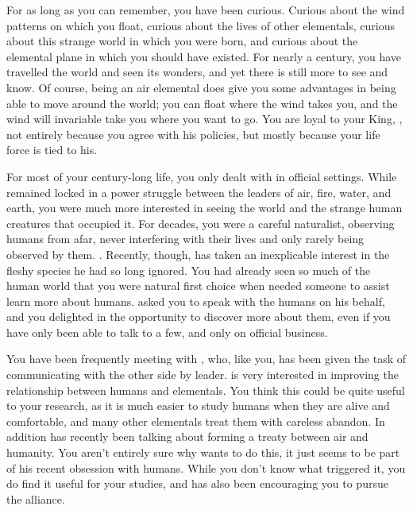 \documentclass[char]{elementals}
\begin{document}
\name{\cNaturalist{}}

For as long as you can remember, you have been curious.  Curious about the wind patterns on which you float, curious about the lives of other elementals, curious about this strange world in which you were born, and curious about the elemental plane in which you should have existed.  For nearly a century, you have travelled the world and seen its wonders, and yet there is still more to see and know.  Of course, being an air elemental does give you some advantages in being able to move around the world; you can float where the wind takes you, and the wind will invariable take you where you want to go.  You are loyal to your King, \cKing{\intro}, not entirely because you agree with his policies, but mostly because your life force is tied to his.

For most of your century-long life, you only dealt with \cKing{} in official settings.  While \cKing{} remained locked in a power struggle between the leaders of air, fire, water, and earth, you were much more interested in seeing the world and the strange human creatures that occupied it.  For decades, you were a careful naturalist, observing humans from afar, never interfering with their lives and only rarely being observed by them.  .  Recently, though, \cKing{} has taken an inexplicable interest in the fleshy species he had so long ignored.  You had already seen so much of the human world that you were \cKing{\their} natural first choice when \cKing{\they} needed someone to assist \cKing{\them} learn more about humans.  \cKing{\They} asked you to speak with the humans on his behalf, and you delighted in the opportunity to discover more about them, even if you have only been able to talk to a few, and only on official business.

You have been frequently meeting with \cDiplomat{\intro}, who, like you, has been given the task of communicating with the other side by \cDiplomat{\their} leader.   is very interested in improving the relationship between humans and elementals.  You think this could be quite useful to your research, as it is much easier to study humans when they are alive and comfortable, and many other elementals treat them with careless abandon.  In addition \cKing{} has recently been talking about forming a treaty between air and humanity.  You aren't entirely sure why \cKing{\they} wants to do this, it just seems to be part of his recent obsession with humans.  While you don't know what triggered it, you do find it useful for your studies, and \cDiplomat{} has also been encouraging you to pursue the alliance.
\end{document}
